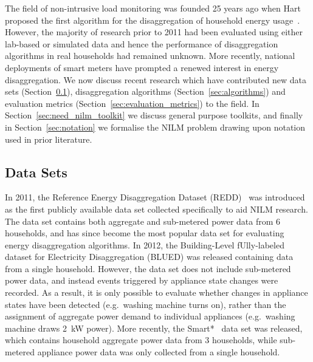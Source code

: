 \documentclass{sig-alternate}
\newcommand{\bluecolor}[1]{\textcolor{blue}{#1}}
\newcommand{\secref}[1]{Section~\ref{#1}}
\begin{document}
\noindent
The field of non-intrusive load monitoring was founded 25 years ago when Hart proposed the first algorithm for the disaggregation of household energy usage~\cite{hart_1992,armel_2013}. 
However, the majority of research prior to 2011 had been evaluated using either lab-based or simulated data and hence the performance of disaggregation algorithms in real households had remained unknown. More recently, national deployments of smart meters have prompted a renewed interest in energy disaggregation. 
We now discuss recent research which have contributed new data sets (\secref{sec:datasets}), disaggregation algorithms (\secref{sec:algorithms}) and evaluation metrics (\secref{sec:evaluation_metrics}) to the field. 
In \secref{sec:need_nilm_toolkit} we discuss general purpose toolkits, and finally in \secref{sec:notation} we formalise the NILM problem drawing upon notation used in prior literature.

\subsection{Data Sets}
\label{sec:datasets}
\noindent In 2011, the Reference Energy Disaggregation Dataset (REDD)~\cite{redd} was introduced as the first publicly available data set collected specifically to aid NILM research. The data set contains both aggregate and sub-metered power data from 6 households, and has since become the most popular data set for evaluating energy disaggregation algorithms. In 2012, the Building-Level fUlly-labeled dataset for Electricity Disaggregation (BLUED) \cite{blued} was released containing data from a single household. However, the data set does not include sub-metered power data, and instead events triggered by appliance state changes were recorded. 
As a result, it is only possible to evaluate whether changes in appliance states have been detected (e.g.\ washing machine turns on), rather than the assignment of aggregate power demand to individual appliances (e.g.\ washing machine draws 2~kW power). More recently, the Smart*~\cite{smart} data set was released, which contains household aggregate power data from 3 households, while sub-metered appliance power data was only collected from a single household.
\end{document}
